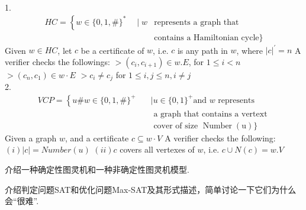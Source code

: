 \documentclass[a4paper, justified]{tufte-handout}
\begin{document}
\begin{solution}
  1.
  $$
    \begin{aligned}
      H C=\left\{w \in\{0,1, \#\}^* \quad \mid w\right. & \text{represents a graph that} \\&\text{contains a Hamiltonian cycle}\}
    \end{aligned}
  $$
  Given $w \in H C$, let $c$ be a certificate of $w$, i.e. $c$ is any path in $w$, where $|c|^{\prime}=n$
  A verifier checks the followings:
  $>\left(c_i, c_{i+1}\right) \in w . E$, for $1 \leq i<n$
  $>\left(c_n, c_1\right) \in w \cdot E$
  $>c_i \neq c_j$ for $1 \leq i, j \leq n, i \neq j$\\
  2.
  $$
    \begin{aligned}
      V C P=\left\{u \# w \in\{0,1, \#\}^{+} \quad\right. & \mid u \in\{0,1\}^{+} \text {and } w \text { represents }   \\
                                                          & \text { a graph that contains a vertext }                   \\
                                                          & \text { cover of size } \operatorname{Number}(\mathrm{u})\}
    \end{aligned}
  $$
  Given a graph $w$, and a certificate $c \subseteq w \cdot V$
  A verifier checks the following:
  $(i)|c|=N u m b e r(u)$
  $(ii)c$ covers all vertexes of $w$, i.e. $c \cup N(c)=w . V$
\end{solution}

\beginoptional



\beginot
\begin{ot}
  介绍一种确定性图灵机和一种非确定性图灵机模型.
\end{ot}


\begin{ot}[SAT]
  介绍判定问题SAT和优化问题Max-SAT及其形式描述，简单讨论一下它们为什么会``很难''.
\end{ot}




% 
\end{document}
